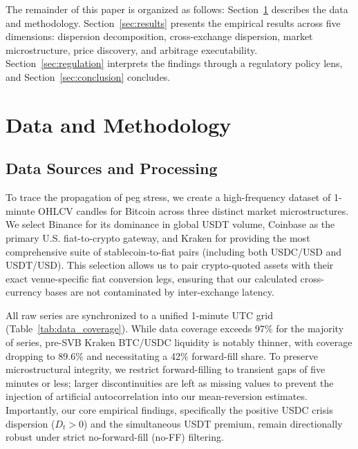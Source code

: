 \documentclass[12pt,twocolumn]{article}
\begin{document}
The remainder of this paper is organized as follows: Section~\ref{sec:data} describes the data and methodology. Section~\ref{sec:results} presents the empirical results across five dimensions: dispersion decomposition, cross-exchange dispersion, market microstructure, price discovery, and arbitrage executability. Section~\ref{sec:regulation} interprets the findings through a regulatory policy lens, and Section~\ref{sec:conclusion} concludes.


\section{Data and Methodology}\label{sec:data}

\subsection{Data Sources and Processing}

To trace the propagation of peg stress, we create a high-frequency dataset of 1-minute OHLCV candles for Bitcoin across three distinct market microstructures. We select Binance for its dominance in global USDT volume, Coinbase as the primary U.S. fiat-to-crypto gateway, and Kraken for providing the most comprehensive suite of stablecoin-to-fiat pairs (including both USDC/USD and USDT/USD). This selection allows us to pair crypto-quoted assets with their exact venue-specific fiat conversion legs, ensuring that our calculated cross-currency bases are not contaminated by inter-exchange latency.

All raw series are synchronized to a unified 1-minute UTC grid (Table~\ref{tab:data_coverage}). While data coverage exceeds 97\% for the majority of series, pre-SVB Kraken BTC/USDC liquidity is notably thinner, with coverage dropping to 89.6\% and necessitating a 42\% forward-fill share. To preserve microstructural integrity, we restrict forward-filling to transient gaps of five minutes or less; larger discontinuities are left as missing values to prevent the injection of artificial autocorrelation into our mean-reversion estimates. Importantly, our core empirical findings, specifically the positive USDC crisis dispersion ($D_t > 0$) and the simultaneous USDT premium, remain directionally robust under strict no-forward-fill (no-FF) filtering.
\end{document}
